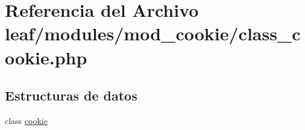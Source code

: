 \hypertarget{class__cookie_8php}{\section{Referencia del Archivo leaf/modules/mod\-\_\-cookie/class\-\_\-cookie.php}
\label{class__cookie_8php}
}
\subsection*{Estructuras de datos}
\begin{DoxyCompactItemize}
\item 
class \hyperlink{classcookie}{cookie}
\end{DoxyCompactItemize}
